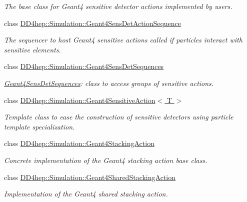 \begin{DoxyCompactItemize}
\begin{DoxyCompactList}\small\item\em The base class for Geant4 sensitive detector actions implemented by users. \end{DoxyCompactList}\item 
class \hyperlink{class_d_d4hep_1_1_simulation_1_1_geant4_sens_det_action_sequence}{D\+D4hep\+::\+Simulation\+::\+Geant4\+Sens\+Det\+Action\+Sequence}
\begin{DoxyCompactList}\small\item\em The sequencer to host Geant4 sensitive actions called if particles interact with sensitive elements. \end{DoxyCompactList}\item 
class \hyperlink{class_d_d4hep_1_1_simulation_1_1_geant4_sens_det_sequences}{D\+D4hep\+::\+Simulation\+::\+Geant4\+Sens\+Det\+Sequences}
\begin{DoxyCompactList}\small\item\em \hyperlink{class_d_d4hep_1_1_simulation_1_1_geant4_sens_det_sequences}{Geant4\+Sens\+Det\+Sequences}\+: class to access groups of sensitive actions. \end{DoxyCompactList}\item 
class \hyperlink{class_d_d4hep_1_1_simulation_1_1_geant4_sensitive_action}{D\+D4hep\+::\+Simulation\+::\+Geant4\+Sensitive\+Action$<$ T $>$}
\begin{DoxyCompactList}\small\item\em Template class to ease the construction of sensitive detectors using particle template specialization. \end{DoxyCompactList}\item 
class \hyperlink{class_d_d4hep_1_1_simulation_1_1_geant4_stacking_action}{D\+D4hep\+::\+Simulation\+::\+Geant4\+Stacking\+Action}
\begin{DoxyCompactList}\small\item\em Concrete implementation of the Geant4 stacking action base class. \end{DoxyCompactList}\item 
class \hyperlink{class_d_d4hep_1_1_simulation_1_1_geant4_shared_stacking_action}{D\+D4hep\+::\+Simulation\+::\+Geant4\+Shared\+Stacking\+Action}
\begin{DoxyCompactList}\small\item\em Implementation of the Geant4 shared stacking action. \end{DoxyCompactList}\item 

\end{DoxyCompactItemize}
